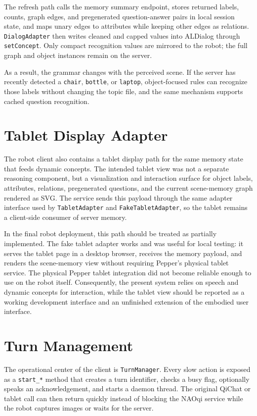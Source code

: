 The refresh path calls the memory summary endpoint, stores returned labels, counts, graph edges, and pregenerated question-answer pairs in local session state, and maps unary edges to attributes while keeping other edges as relations.
\texttt{DialogAdapter} then writes cleaned and capped values into ALDialog through \texttt{setConcept}.
Only compact recognition values are mirrored to the robot; the full graph and object instances remain on the server.

As a result, the grammar changes with the perceived scene.
If the server has recently detected a \texttt{chair}, \texttt{bottle}, or \texttt{laptop}, object-focused rules can recognize those labels without changing the topic file, and the same mechanism supports cached question recognition.

\section{Tablet Display Adapter}

The robot client also contains a tablet display path for the same memory state that feeds dynamic concepts.
The intended tablet view was not a separate reasoning component, but a visualization and interaction surface for object labels, attributes, relations, pregenerated questions, and the current scene-memory graph rendered as SVG.
The service sends this payload through the same adapter interface used by \texttt{TabletAdapter} and \texttt{FakeTabletAdapter}, so the tablet remains a client-side consumer of server memory.

In the final robot deployment, this path should be treated as partially implemented.
The fake tablet adapter works and was useful for local testing: it serves the tablet page in a desktop browser, receives the memory payload, and renders the scene-memory view without requiring Pepper's physical tablet service.
The physical Pepper tablet integration did not become reliable enough to use on the robot itself.
Consequently, the present system relies on speech and dynamic concepts for interaction, while the tablet view should be reported as a working development interface and an unfinished extension of the embodied user interface.

\section{Turn Management}\label{sec:client-turn-management}

The operational center of the client is \texttt{TurnManager}.
Every slow action is exposed as a \texttt{start\_*} method that creates a turn identifier, checks a busy flag, optionally speaks an acknowledgement, and starts a daemon thread.
The original QiChat or tablet call can then return quickly instead of blocking the NAOqi service while the robot captures images or waits for the server.

